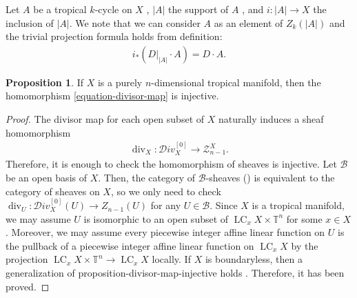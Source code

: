 \documentclass[a4paper,dvipdfmx,reqno,12pt]{amsart}
\theoremstyle{definition}
\newtheorem{proposition}[theorem]{Proposition}
\newcommand{\opn}[1]{\operatorname{#1}}
\numberwithin{equation}{section}
\begin{document}
Let $A$ be a tropical $k$-cycle on $X$
, $|A|$ the support of $A$
\cite[Definition 3.5]{MR4637248},
and $i\colon |A|\to X$
the inclusion of $|A|$.
We note that we can consider $A$ as an
element of $Z_k(|A|)$ and 
the trivial projection
formula holds from definition:
\begin{align}
\label{equation-projection-formula}
i_*(D|_{|A|}\cdot A)=D\cdot A.
\end{align}

\begin{proposition}
\label{proposition-divisor-map-injective}
If $X$ is a purely $n$-dimensional
tropical manifold,
then the homomorphism \eqref{equation-divisor-map}
is injective.
\end{proposition}
\begin{proof}
The divisor map for each open subset of $X$
naturally induces
a sheaf homomorphism
\begin{align}
\opn{div}_X\colon \mathcal{D}iv_X^{[0]}\to 
\mathscr{Z}_{n-1}^{X}.
\end{align}
Therefore, it is enough to check the homomorphism
of sheaves is injective.
Let $\mathcal{B}$ be an open basis of $X$.
Then, the category of $\mathcal{B}$-sheaves
(\cite[p.49-50]{MR2675155})
is equivalent to the category of sheaves on
$X$, so we only need to check 
$\opn{div}_{U}\colon \mathcal{D}iv_X^{[0]}(U)\to Z_{n-1}(U)$
for any $U\in \mathcal{B}$.
Since $X$ is a tropical manifold, we may assume
$U$ is isomorphic to an open subset
of $\opn{LC}_x X\times \mathbb{T}^{n}$
for some $x\in X$.
Moreover, we may assume every piecewise
integer affine linear function on $U$ is the pullback
of a piecewise
integer affine linear function on $\opn{LC}_x X$ 
by the projection $\opn{LC}_x X\times \mathbb{T}^{n}\to \opn{LC}_x X$
locally. If $X$ is boundaryless, then
a generalization of {proposition-divisor-map-injective}
holds
\cite[Theorem 4.5]{MR4246795}.
Therefore, it has been proved.
\end{proof}
\end{document}
